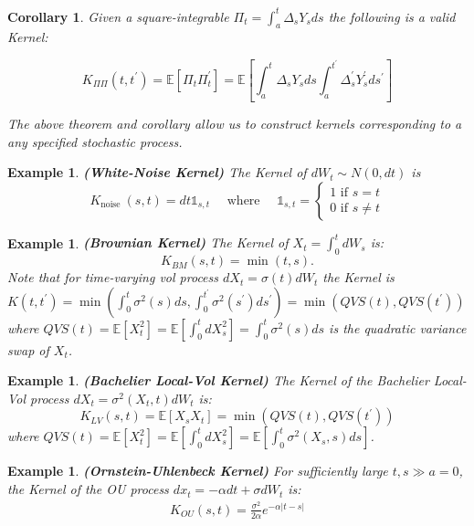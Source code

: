 \documentclass[11pt]{article}
\theoremstyle{plain} %
\newtheorem{corollary}[theorem]{Corollary}
\newtheorem{example}[theorem]{Example}
\theoremstyle{remark}
\newcommand{\bOne}{\mathds{1}}
\begin{document}
\begin{corollary}
  Given a square-integrable $\Pi_{t}=\int_{a}^{t} \Delta_{s} Y_{s} d s$ the
following is a valid Kernel:

$$
  K_{\Pi \Pi}\left(t, t^{\prime}\right)=\mathbb{E}\left[\Pi_{t} \Pi_{t}^{\prime}\right]=\mathbb{E}\left[\int_{a}^{t} \Delta_{s} Y_{s} d s \int_{a}^{t^{\prime}} \Delta_{s}^{\prime} Y_{s}^{\prime} d s^{\prime}\right]
$$

The above theorem and corollary allow us to construct kernels corresponding to a
any specified stochastic process.
\end{corollary}

\begin{example}
  \textbf{(White-Noise Kernel)} The Kernel of $d W_{t} \sim N(0, d t)$ is
  $$
    K_{\text {noise }}(s, t)=d t \bOne_{s, t}
    \quad \text{ where } \quad
    \bOne_{s, t}=
    \begin{cases}
      1 \text{ if } s=t \\
      0 \text{ if } s\neq t
    \end{cases}
  $$
\end{example}

\begin{example}
  \textbf{(Brownian Kernel)} The Kernel of $X_{t}=\int_{0}^{t} d W_{s}$ is:
  $$
    K_{B M}(s, t)=\min (t, s) .
  $$
  Note that for time-varying vol process $d X_{t}=\sigma(t) d W_{t}$ the Kernel is
  $K\left(t, t^{\prime}\right)=\min \left(\int_{0}^{t} \sigma^{2}(s) d s,
    \int_{0}^{t^{\prime}} \sigma^{2}\left(s^{\prime}\right) d s^{\prime}\right)=\min \left(Q V
    S(t), Q V S\left(t^{\prime}\right)\right)$ where $Q V
    S(t)=\mathbb{E}\left[X_{t}^{2}\right]=\mathbb{E}\left[\int_{0}^{t} d
      X_{s}^{2}\right]=\int_{0}^{t} \sigma^{2}(s) d s$ is the quadratic variance swap
  of $X_{t}$.
\end{example}

\begin{example}
  \textbf{(Bachelier Local-Vol Kernel)} The Kernel of the Bachelier Local-Vol process $d X_{t}=\sigma^{2}\left(X_{t},
    t\right) d W_{t}$ is:
  $$
    K_{L V}(s, t)=\mathbb{E}\left[X_{s} X_{t}\right]=\min \left(Q V S(t), Q V S\left(t^{\prime}\right)\right)
  $$
  where $Q V S(t)=\mathbb{E}\left[X_{t}^{2}\right]=\mathbb{E}\left[\int_{0}^{t} d
      X_{s}^{2}\right]=\mathbb{E}\left[\int_{0}^{t} \sigma^{2}\left(X_{s}, s\right) d
      s\right]$.
\end{example}

\begin{example}
  \textbf{(Ornstein-Uhlenbeck Kernel)} For sufficiently large $t, s \gg a=0$, the Kernel of the OU process $d
    x_{t}=-\alpha d t+\sigma d W_{t}$ is:
  \begin{align}
    K_{O U}(s, t)=\frac{\sigma^{2}}{2 \alpha} e^{-\alpha|t-s|}
    \label{eq: OU kernel}
  \end{align}
\end{example}
\end{document}

